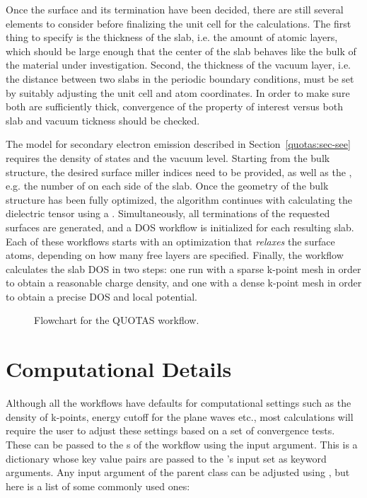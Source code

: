\begin{refsection}
Once the surface and its termination have been decided, there are still 
several elements to consider before finalizing the unit cell for the 
calculations. The first thing to specify is the thickness of the slab, i.e. 
the amount of atomic layers, which should be large enough that the center of 
the slab behaves like the bulk of the material under investigation. Second, 
the thickness of the vacuum layer, i.e. the distance between two slabs in the 
periodic boundary conditions, must be set by suitably adjusting the unit cell 
and atom coordinates. In order to make sure both are sufficiently thick, 
convergence of the property of interest versus both slab and vacuum tickness 
should be checked. 
 
The model for secondary electron emission described in 
Section~\ref{quotas:sec-see} requires the density of states and the vacuum level. 
Starting from the bulk structure, the desired surface miller indices need to 
be provided, as well as the , e.g. the number of 
 on each side of the slab. Once the geometry of the bulk 
structure has been fully optimized, the algorithm continues with calculating 
the dielectric tensor using a . Simultaneously, all 
terminations of the requested surfaces are generated, and a DOS workflow is 
initialized for each resulting slab. Each of these workflows starts with an 
optimization that \textit{relaxes} the surface atoms, depending on how many 
free layers are specified. Finally, the workflow calculates the slab DOS in 
two steps: one run with a sparse k-point mesh in order to obtain a reasonable 
charge density, and one with a dense k-point mesh in order to obtain a precise 
DOS and local potential. 
 
\begin{figure}[ht] 
 
\caption{\label{automation:fig-quotas} Flowchart for the QUOTAS workflow.} 
\end{figure} 
 
\section{\label{automation:sec-computational}Computational Details} 
 
Although all the workflows have defaults for computational settings such as 
the density of k-points, energy cutoff for the plane waves etc., most 
calculations will require the user to adjust these settings based on a set of 
convergence tests. These can be passed to the s of the workflow 
using the  input argument. This is a dictionary 
whose key value pairs are passed to the 
's input 
set as keyword arguments. Any input argument of the parent  
class can be adjusted using , but here is a list of 
some commonly used ones: 
 

\end{refsection}
